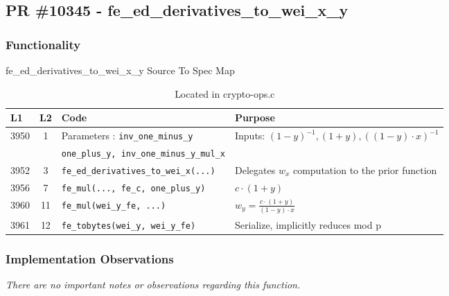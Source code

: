 \documentclass[12pt,titlepage,table]{article}
\begin{document}
\newpage
\subsection{PR \#10345 - fe\_ed\_derivatives\_to\_wei\_x\_y}
\subsubsection{Functionality}


\begin{table}[htbp]
\caption{fe\_ed\_derivatives\_to\_wei\_x\_y Source To Spec Map}
\begin{adjustwidth}{-1in}{-1in}
\centering
{
\begin{tabular}{| l | c | l | l |}
\hline
\textbf{L1} & \textbf{L2} & \textbf{Code} & \textbf{Purpose} \\
\hline
\hline
3950 & 1 & Parameters : \verb+inv_one_minus_y+ & Inputs: $(1-y)^{-1}, (1+y), ((1-y) \cdot x)^{-1}$ \\
&& \verb+one_plus_y, inv_one_minus_y_mul_x+& \\
3952 & 3 & \verb+fe_ed_derivatives_to_wei_x(...)+ & Delegates $w_x$ computation to the prior function\\
3956 & 7 & \verb+fe_mul(..., fe_c, one_plus_y)+ & $c \cdot (1+y)$\\ 
3960 & 11 & \verb+fe_mul(wei_y_fe, ...)+ & $w_y = \frac{c \cdot (1+y)}{(1-y) \cdot x}$ \\
3961 &12& \verb+fe_tobytes(wei_y, wei_y_fe)+&Serialize, implicitly reduces mod p \\
\hline
\end{tabular}}
\end{adjustwidth}
\caption*{Located in crypto-ops.c}
\end{table}
\subsubsection{Implementation Observations}
\textit{There are no important notes or observations regarding this function.}
\end{document}
